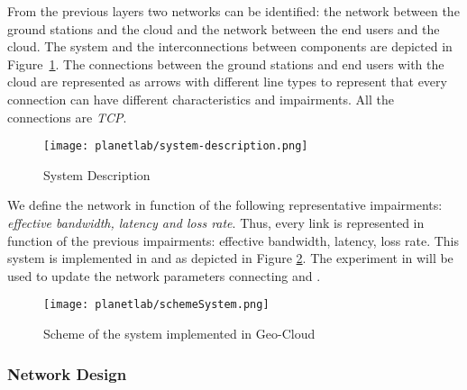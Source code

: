 From the previous layers two networks can be identified: the network between the
ground stations and the cloud and the network between the end users and the
cloud. The system and the interconnections between components are depicted in
Figure~\ref{fig:ple-system-description}. The connections between the ground stations and end users with the
cloud are represented as arrows with different line types to represent that
every connection can have different characteristics and impairments. All the
connections are \emph{TCP}.

\begin{figure}[!h]
\begin{center}
\texttt{[image: planetlab/system-description.png]}

\caption{System Description}
\label{fig:ple-system-description}
\end{center}
\end{figure}

We define the network in function of the following representative impairments: \emph{effective bandwidth, latency and loss rate}. Thus, every link is represented in function of the previous impairments: effective bandwidth, latency, loss rate.
This system is implemented in \vw and \bonfire as depicted in Figure
\ref{fig:ple-scheme-system}. The experiment in \pl will be used to update the
network parameters connecting \vw and \bonfire.

\begin{figure}[!h]
\begin{center}
\texttt{[image: planetlab/schemeSystem.png]}
\caption{Scheme of the system implemented in Geo-Cloud}
\label{fig:ple-scheme-system}
\end{center}
\end{figure}


\subsubsection{Network Design}

